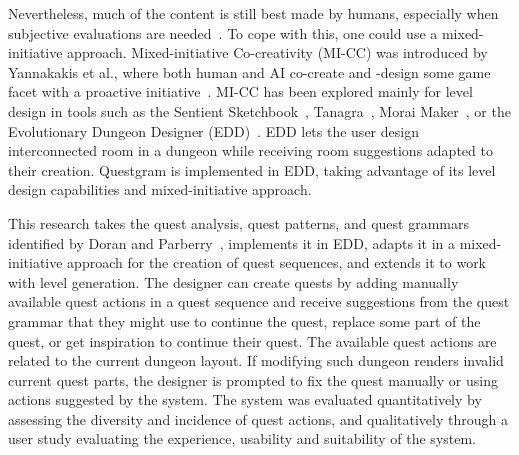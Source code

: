 Nevertheless, much of the content is still best made by humans, especially when subjective evaluations are needed~\cite{p8shaker_procedural_2016}. To cope with this, one could use a mixed-initiative approach.
Mixed-initiative Co-creativity (MI-CC) was introduced by Yannakakis et al., where both human and AI co-create and -design some game facet with a proactive initiative~\cite{p8yannakakis2014micc}. MI-CC has been explored mainly for level design in tools such as the Sentient Sketchbook~\cite{p8Liapis2013-sentientsketchbook}, Tanagra~\cite{p8smith_tanagra:_2011}, Morai Maker~\cite{p8guzdial-lvldsg-aiide-2018}, or the Evolutionary Dungeon Designer (EDD)~\cite{p8Alvarez2020-ICMAPE}. EDD lets the user design interconnected room in a dungeon while receiving room suggestions adapted to their creation. Questgram is implemented in EDD, taking advantage of its level design capabilities and mixed-initiative approach.


This research takes the quest analysis, quest patterns, and quest grammars identified by Doran and Parberry~\cite{p8Doran2011-questsMMORPGs}, implements it in EDD, adapts it in a mixed-initiative approach for the creation of quest sequences, and extends it to work with level generation. The designer can create quests by adding manually available quest actions in a quest sequence and receive suggestions from the quest grammar that they might use to continue the quest, replace some part of the quest, or get inspiration to continue their quest. The available quest actions are related to the current dungeon layout. If modifying such dungeon renders invalid current quest parts, the designer is prompted to fix the quest manually or using actions suggested by the system. The system was evaluated quantitatively by assessing the diversity and incidence of quest actions, and qualitatively through a user study evaluating the experience, usability and suitability of the system.





